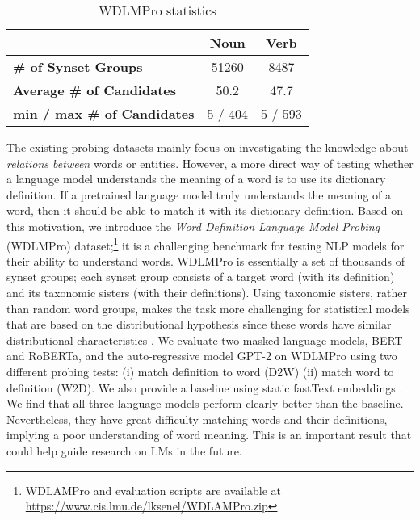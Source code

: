 \documentclass[11pt,a4paper]{article}
\begin{document}
\begin{table}
    \centering
    \begin{tabular}{l|cc}
    \hline
         & \textbf{Noun} & \textbf{Verb} \\ \hline
         \textbf{\# of Synset Groups} & 51260 & 8487 \\
         \textbf{Average \# of Candidates} & 50.2 & 47.7 \\
         \textbf{min / max \# of Candidates} & 5 / 404 & 5 / 593 \\ \hline
    \end{tabular}
    \caption{WDLMPro statistics}
    \label{tab:dataset_stats}
\end{table}

The existing probing datasets mainly focus on investigating
the knowledge about \emph{relations between} words or
entities. However, a more direct way of testing whether a
language model understands the meaning of a word is to use
its dictionary definition. If a pretrained language model
truly understands the meaning of a word, then it should be
able to match it with its dictionary definition.  Based
on this motivation, we introduce the \textit{Word
  Definition Language Model Probing} (WDLMPro) dataset;\footnote{WDLAMPro and evaluation scripts are available at \href{https://www.cis.lmu.de/~lksenel/WDLAMPro.zip}{https://www.cis.lmu.de/\texttildelow lksenel/WDLAMPro.zip}} it
is a challenging benchmark for testing NLP models for their
ability to understand words.  WDLMPro is essentially a set
of thousands of synset groups; each synset group consists of
a target word (with its definition) and its taxonomic
sisters (with their definitions).
Using taxonomic sisters, rather than random word groups, 
makes the task more challenging for statistical models 
that are based on the distributional hypothesis since 
these words  have similar distributional characteristics
\cite{lenci08distributional}. We evaluate two masked
language models, BERT and RoBERTa, and the auto-regressive
model GPT-2 on WDLMPro using two different probing
tests: (i) match definition to word (D2W)
  (ii) match word to definition (W2D). We also provide a
  baseline using static fastText embeddings
  \cite{mikolov18fastText}.  We find that all three
language models perform clearly
better than the baseline. Nevertheless, they have great
difficulty matching words and their definitions, implying a
poor understanding of word meaning.  This is an important
result that could help guide research on LMs in the future.
\end{document}
